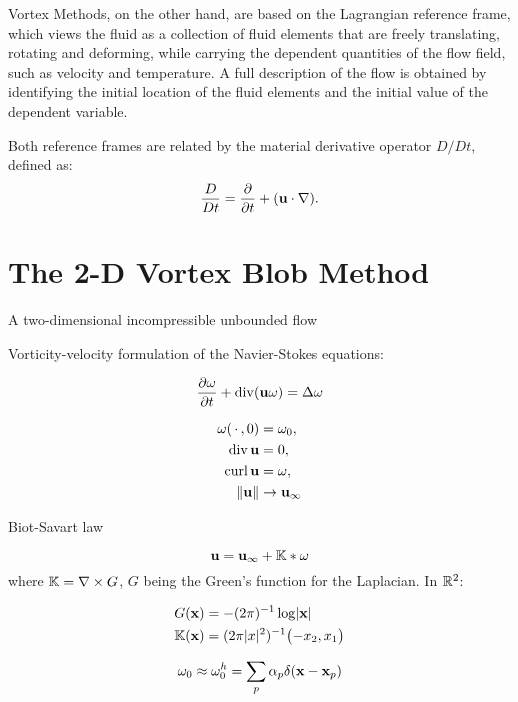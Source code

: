 Vortex Methods, on the other hand, are based on the Lagrangian reference frame,
which views the fluid as a collection of fluid elements
that are freely translating, rotating and deforming,
while carrying the dependent quantities of the flow field,
such as velocity and temperature.
A full description of the flow is obtained by
identifying the initial location of the fluid elements
and the initial value of the dependent variable.

Both reference frames are related by the material derivative operator \(D/Dt\),
defined as:
\begin{equation}
  \frac{D}{Dt} = \frac{\partial}{\partial t} + (\mathbf u\cdot\nabla).
\end{equation}



\section{The 2-D Vortex Blob Method}
\label{sec:vortex-blob-method}

A two-dimensional incompressible unbounded flow


Vorticity-velocity formulation of the Navier-Stokes equations:

\begin{equation}
  \label{eq:vort-vel-navier-stokes}
  \frac{\partial\omega}{\partial t} + \operatorname{div}(\mathbf u\omega) = \Delta\omega
\end{equation}

\begin{align}
  \omega(\,\cdot\,{}, 0) &= \omega_0, \\
  \operatorname{div}\mathbf u &= 0, \\
  \operatorname{curl}\mathbf u &= \omega, \\
  \lVert\mathbf u\rVert &\to\mathbf u_\infty
\end{align}

Biot-Savart law

\begin{equation}
  \label{eq:biot-savart-law}
  \mathbf u = \mathbf u_\infty + \mathbb{K} * \omega
\end{equation}
where \(\mathbb{K} = \nabla\times G\),
\(G\) being the Green's function for the Laplacian.
In \(\mathbb{R}^2\):

\begin{align}
  G(\mathbf x) &= -(2\pi)^{-1} \log\lvert\mathbf x\rvert \\
  \mathbb{K}(\mathbf x) &= (2\pi\lvert x\rvert^2)^{-1} \bigl(-x_2, x_1\bigr) 
\end{align}

\begin{equation}
  \label{eq:initial-vorticity-approximation}
  \omega_0\approx\omega_0^h = \sum_p\alpha_p\delta(\mathbf x - \mathbf x_p)
\end{equation}

